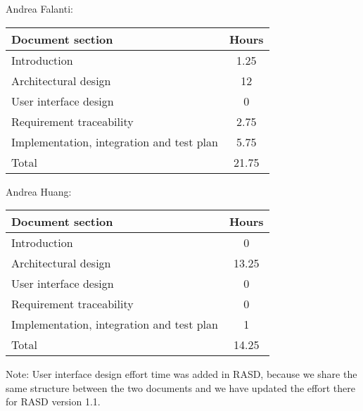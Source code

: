 Andrea Falanti:

\begin{tabular}{|l|c|}
    \hline
    Document section & Hours \\
    \hline
     Introduction & 1.25\\
     Architectural design & 12\\
     User interface design & 0\\
     Requirement traceability & 2.75\\
     Implementation, integration and test plan & 5.75\\
     \hline
     Total & 21.75\\
     \hline
\end{tabular}
\vskip 0.3in

Andrea Huang:

\begin{tabular}{|l|c|}
    \hline
    Document section & Hours \\
    \hline
     Introduction & 0\\
     Architectural design & 13.25\\
     User interface design & 0\\
     Requirement traceability & 0\\
     Implementation, integration and test plan & 1\\
     \hline
     Total & 14.25\\
     \hline
\end{tabular}

\bigskip
\bigskip
Note: User interface design effort time was added in RASD, because we share the same structure between the two documents and we have updated the effort there for RASD version 1.1. 
